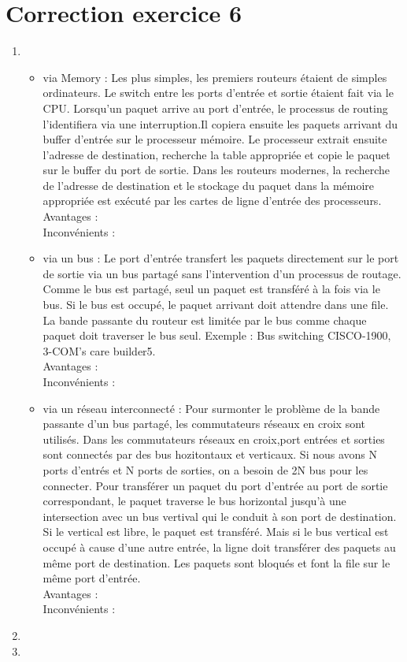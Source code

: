 \documentclass[a4paper, 11pt, titlepage]{article}
\begin{document}
\section{Correction exercice 6}
\begin{enumerate}[label=(\alph*)]
\item
\begin{itemize}
\item via Memory : Les plus simples, les premiers routeurs étaient de simples ordinateurs. Le switch entre les ports d'entrée et sortie étaient fait via le CPU. Lorsqu'un paquet arrive au port d'entrée, le processus de routing l'identifiera via une interruption.Il copiera ensuite les paquets arrivant du buffer d'entrée sur le processeur mémoire. Le processeur extrait ensuite l'adresse de destination, recherche la table appropriée et copie le paquet sur le buffer du port de sortie. Dans les routeurs modernes, la recherche de l'adresse de destination et le stockage du paquet dans la mémoire appropriée est exécuté par les cartes de ligne d'entrée des processeurs.\\
Avantages : \\
Inconvénients : \\
\item via un bus : Le port d'entrée transfert les paquets directement sur le port de sortie via un bus partagé sans l'intervention d'un processus de routage. Comme le bus est partagé, seul un paquet est transféré à la fois via le bus. Si le bus est occupé, le paquet arrivant doit attendre dans une file. La bande passante du routeur est limitée par le bus comme chaque paquet doit traverser le bus seul. Exemple :  Bus switching CISCO-1900, 3-COM’s care builder5.\\
Avantages : \\
Inconvénients : \\
\item via un réseau interconnecté : Pour surmonter le problème de la bande passante d'un bus partagé, les commutateurs réseaux en croix sont utilisés. Dans les commutateurs réseaux en croix,port  entrées et sorties sont connectés par des bus hozitontaux et verticaux. Si nous avons N ports d'entrés et N ports de sorties, on a besoin de 2N bus pour les connecter. Pour transférer un paquet du port d'entrée au port de sortie correspondant, le paquet traverse le bus horizontal jusqu'à une intersection avec un bus vertival qui le conduit à son port de destination. Si le vertical est libre, le paquet est transféré. Mais si le bus vertical est occupé à cause d'une autre entrée, la ligne doit transférer des paquets au même port de destination. Les paquets sont bloqués et font la file sur le même port d'entrée.\\
Avantages : \\
Inconvénients : \\
\end{itemize}

\item 

\item 

\end{enumerate}
\end{document}
